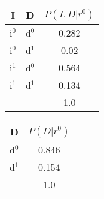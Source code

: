 \begin{multicols}{2}
 
 \begin{tabular}{|c|c|c|}
 \hline
 I & D & $P(I,D|r^0)$ \\ \hline
 i$^0$ & d$^0$  & 0.282 \\ \hline
 i$^0$ & d$^1$  & 0.02 \\ \hline
 i$^1$ & d$^0$  & 0.564 \\ \hline
 i$^1$ & d$^1$  & 0.134\\ \hline
       &        &  1.0     \\ \hline
 \end{tabular}

 \begin{tabular}{|c|c|}
 \hline
  D & $P(D|r^0)$ \\ \hline
  d$^0$  & 0.846 \\ \hline
  d$^1$  & 0.154 \\ \hline
         & 1.0     \\ \hline
 \end{tabular}

\end{multicols}


